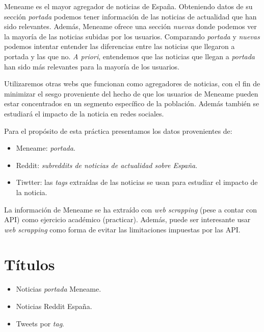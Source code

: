 \documentclass[a4paper,12pt]{article}
\begin{document}
Meneame es el mayor agregador de noticias de Espa\~na. Obteniendo datos de su secci\'on {\itshape portada} podemos tener informaci\'on de las noticias de actualidad que han sido relevantes. Adem\'as, Meneame ofrece una secci\'on {\itshape nuevas} donde podemos ver  la mayor\'ia de las noticias subidas por los usuarios. Comparando {\itshape portada} y {\itshape nuevas} podemos intentar entender las diferencias entre las noticias que llegaron a portada y las que no. {\itshape A priori}, entendemos que las noticias que llegan a {\itshape portada}  han sido m\'as relevantes para la mayor\'ia de los usuarios.

Utilizaremos otras webs que funcionan como agregadores de noticias, con el fin de minimizar el sesgo proveniente del hecho de que los usuarios de Meneame pueden estar concentrados en un segmento espec\'ifico de la poblaci\'on. Adem\'as tambi\'en se estudiar\'a el impacto de la noticia en redes sociales.

Para el prop\'osito de esta pr\'actica presentamos los datos provenientes de:

\begin{itemize}
\item Meneame: {\itshape portada}.
\item Reddit: {\itshape subreddits de noticias de actualidad sobre Espa\~na}.
\item Tiwtter: las {\itshape tags} extra\'idas de las noticias se usan para estudiar el impacto de la noticia. 

\end{itemize}

La informaci\'on de Meneame se ha extra\'ido con {\itshape web scrapping} (pese a contar con API) como ejercicio acad\'emico (practicar). Adem\'as, puede ser interesante usar  {\itshape web scrapping} como forma de evitar las limitaciones impuestas por las API.

\section[item_titulo]{T\'itulos}


\begin{itemize}

\item Noticias {\itshape portada} Meneame.
\item Noticias Reddit Espa\~na.
\item Tweets por {\itshape tag}.


\end{itemize}
\end{document}
